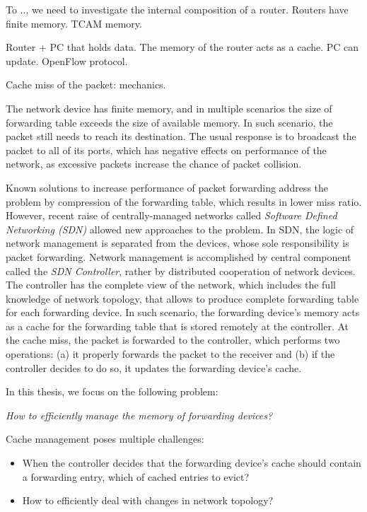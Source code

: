 To .., we need to investigate the internal composition of a router.
Routers have finite memory. TCAM memory.

Router + PC that holds data. The memory of the router acts as a cache. PC can update. OpenFlow protocol.

Cache miss of the packet: mechanics.




The network device has finite memory, and in multiple scenarios the size of forwarding table exceeds the size of available memory.
In such scenario, the packet still needs to reach its destination.
The usual response is to broadcast the packet to all of its ports, which has negative effects on performance of the network, as excessive packets increase the chance of packet collision.

Known solutions to increase performance of packet forwarding address the problem by compression of the forwarding table, which results in lower miss ratio.
However, recent raise of centrally-managed networks called \emph{Software Defined Networking (SDN)} allowed new approaches to the problem.
In SDN, the logic of network management is separated from the devices, whose sole responsibility is packet forwarding.
Network management is accomplished by central component called the \emph{SDN Controller}, rather by distributed cooperation of network devices.
The controller has the complete view of the network, which includes the full knowledge of network topology, that allows to produce complete forwarding table for each forwarding device.
In such scenario, the forwarding device's memory acts as a cache for the forwarding table that is stored remotely at the controller.
At the cache miss, the packet is forwarded to the controller, which performs two operations: (a) it properly forwards the packet to the receiver and (b) if the controller decides to do so, it updates the forwarding device's cache.

In this thesis, we focus on the following problem:
\begin{center}
  \emph{How to efficiently manage the memory of forwarding devices?}
\end{center}

Cache management poses multiple challenges:
\begin{itemize}
  \item When the controller decides that the forwarding device's cache should contain a forwarding entry, which of cached entries to evict?
  \item How to efficiently deal with changes in network topology?
\end{itemize}

